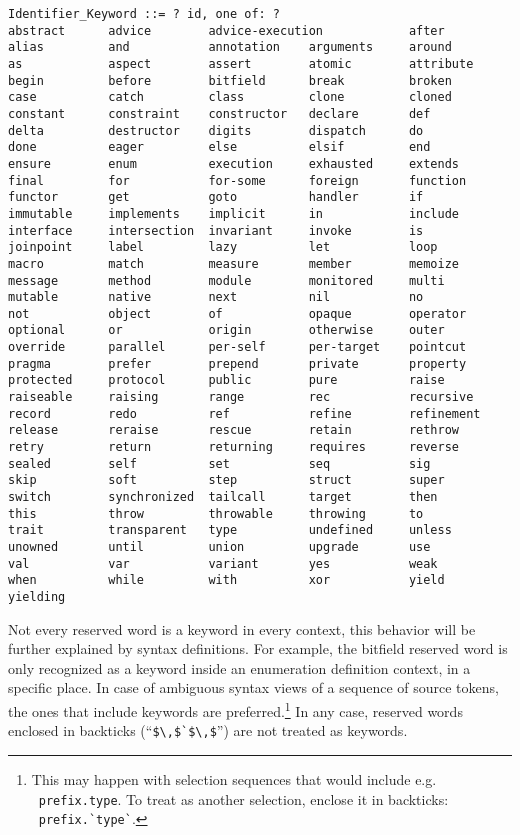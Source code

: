 \syntax\begin{lstlisting}
Identifier_Keyword ::= ? id, one of: ?
abstract      advice        advice-execution            after
alias         and           annotation    arguments     around
as            aspect        assert        atomic        attribute
begin         before        bitfield      break         broken
case          catch         class         clone         cloned
constant      constraint    constructor   declare       def
delta         destructor    digits        dispatch      do
done          eager         else          elsif         end
ensure        enum          execution     exhausted     extends
final         for           for-some      foreign       function
functor       get           goto          handler       if
immutable     implements    implicit      in            include
interface     intersection  invariant     invoke        is
joinpoint     label         lazy          let           loop
macro         match         measure       member        memoize
message       method        module        monitored     multi
mutable       native        next          nil           no
not           object        of            opaque        operator
optional      or            origin        otherwise     outer
override      parallel      per-self      per-target    pointcut
pragma        prefer        prepend       private       property
protected     protocol      public        pure          raise
raiseable     raising       range         rec           recursive
record        redo          ref           refine        refinement
release       reraise       rescue        retain        rethrow
retry         return        returning     requires      reverse
sealed        self          set           seq           sig
skip          soft          step          struct        super
switch        synchronized  tailcall      target        then
this          throw         throwable     throwing      to
trait         transparent   type          undefined     unless
unowned       until         union         upgrade       use
val           var           variant       yes           weak
when          while         with          xor           yield
yielding
\end{lstlisting}

Not every reserved word is a keyword in every context, this behavior will be further explained by syntax definitions. For example, the bitfield reserved word is only recognized as a keyword inside an enumeration definition context, in a specific place. In case of ambiguous syntax views of a sequence of source tokens, the ones that include keywords are preferred.\footnote{This may happen with selection sequences that would include e.g. ~\lstinline!prefix.type!. To treat  as another selection, enclose it in backticks: ~\lstinline[deletekeywords={type}]!prefix.`type`!.} In any case, reserved words enclosed in backticks (``\lstinline!$\,$`$\,$!'') are not treated as keywords. 





